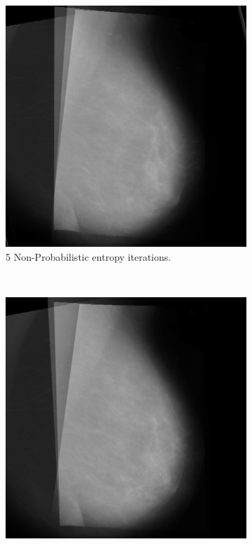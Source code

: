 \begin{figure}[H]
    \centering
    \begin{subfigure}[t]{0.3\textwidth}
        \includegraphics[width=\textwidth]{Chapter3/nonProb-img/nonProb-5.png}
        \caption{5 Non-Probabilistic entropy iterations.}
        \label{fig:5-nonProb}
    \end{subfigure} \hfill
    ~ %
    \begin{subfigure}[t]{0.3\textwidth}
      \includegraphics[width=\textwidth]{Chapter3/nonProb-img/nonProb10.png}

\end{subfigure}
\end{figure}
